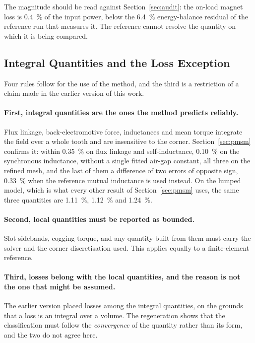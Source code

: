 \documentclass[10pt,a4paper,twocolumn]{article}
\theoremstyle{plain}
\theoremstyle{remark}
\begin{document}
The magnitude should be read against Section~\ref{sec:audit}: the
on-load magnet loss is \SI{0.4}{\percent} of the input power, below the
\SI{6.4}{\percent} energy-balance residual of the reference run that
measures it. The reference cannot resolve the quantity on which it is
being compared.

\subsection{Integral Quantities and the Loss Exception}
\label{sub:integral}

Four rules follow for the use of the method, and the third is a
restriction of a claim made in the earlier version of this work.

\paragraph{First, integral quantities are the ones the method predicts
reliably.}
Flux linkage, back-electromotive force, inductances and mean torque
integrate the field over a whole tooth and are insensitive to the
corner. Section~\ref{sec:pmsm} confirms it: within \SI{0.35}{\percent}
on flux linkage and self-inductance, \SI{0.10}{\percent} on the
synchronous inductance, without a single fitted air-gap constant, all
three on the refined mesh, and the last of them a difference of two
errors of opposite sign, \SI{0.33}{\percent} when the reference mutual
inductance is used instead. On the lumped model, which is what every
other result of Section~\ref{sec:pmsm} uses, the same three quantities
are \SI{1.11}{\percent}, \SI{1.12}{\percent} and \SI{1.24}{\percent}.

\paragraph{Second, local quantities must be reported as bounded.}
Slot sidebands, cogging torque, and any quantity built from them must
carry the solver and the corner discretisation used. This applies
equally to a finite-element reference.

\paragraph{Third, losses belong with the local quantities, and the
reason is not the one that might be assumed.}
The earlier version placed losses among the integral quantities, on the
grounds that a loss is an integral over a volume. The regeneration shows
that the classification must follow the \emph{convergence} of the
quantity rather than its form, and the two do not agree here.
\end{document}
